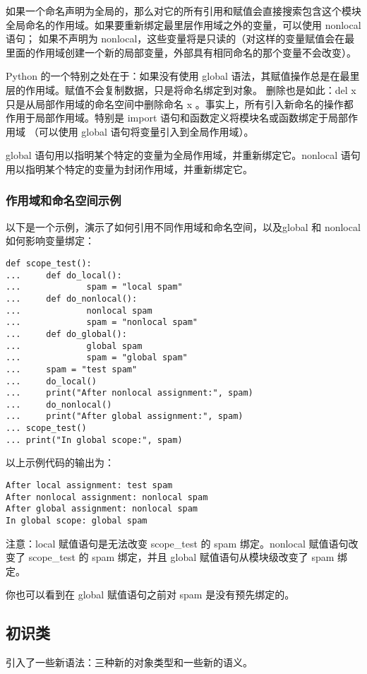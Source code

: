 \documentclass[UTF8]{ctexart}
\begin{document}
如果一个命名声明为全局的，那么对它的所有引用和赋值会直接搜索包含这个模块全局命名的作用域。如果要重新绑定最里层作用域之外的变量，可以使用 nonlocal 语句；
如果不声明为 nonlocal，这些变量将是只读的（对这样的变量赋值会在最里面的作用域创建一个新的局部变量，外部具有相同命名的那个变量不会改变）。

Python 的一个特别之处在于：如果没有使用 global 语法，其赋值操作总是在最里层的作用域。赋值不会复制数据，只是将命名绑定到对象。
删除也是如此：del x 只是从局部作用域的命名空间中删除命名 x 。事实上，所有引入新命名的操作都作用于局部作用域。特别是 import 语句和函数定义将模块名或函数绑定于局部作用域
（可以使用 global 语句将变量引入到全局作用域）。

global 语句用以指明某个特定的变量为全局作用域，并重新绑定它。nonlocal 语句用以指明某个特定的变量为封闭作用域，并重新绑定它。
\subsubsection{作用域和命名空间示例}
以下是一个示例，演示了如何引用不同作用域和命名空间，以及global 和 nonlocal 如何影响变量绑定：
\begin{verbatim}
def scope_test():
...     def do_local():
...             spam = "local spam"
...     def do_nonlocal():
...             nonlocal spam
...             spam = "nonlocal spam"
...     def do_global():
...             global spam
...             spam = "global spam"
...     spam = "test spam"
...     do_local()
...     print("After nonlocal assignment:", spam)
...     do_nonlocal()
...     print("After global assignment:", spam)
... scope_test()
... print("In global scope:", spam)
\end{verbatim}

以上示例代码的输出为：
\begin{verbatim}
After local assignment: test spam
After nonlocal assignment: nonlocal spam
After global assignment: nonlocal spam
In global scope: global spam
\end{verbatim}

注意：local 赋值语句是无法改变 scope\_test 的 spam 绑定。nonlocal 赋值语句改变了
scope\_test 的 spam 绑定，并且 global 赋值语句从模块级改变了 spam 绑定。

你也可以看到在 global 赋值语句之前对 spam 是没有预先绑定的。

\subsection{初识类}
引入了一些新语法：三种新的对象类型和一些新的语义。
\end{document}
